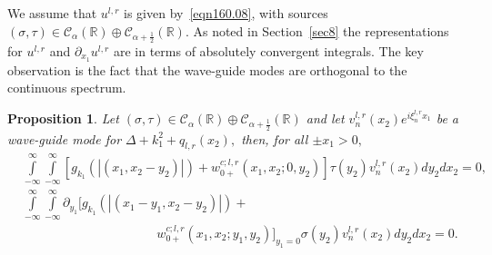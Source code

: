 \documentclass[11pt]{article}
\newcommand\cC{\mathcal{C}}
\newcommand\bbR{\mathbb R}
\newcommand\pa{\partial}
\newtheorem{proposition}{Proposition}
\theoremstyle{definition}
\theoremstyle{remark}
\begin{document}
We assume that $u^{l,r}$ is given by~\eqref{eqn160.08}, with sources
$(\sigma,\tau)\in\cC_{\alpha}(\bbR)\oplus\cC_{\alpha+\frac 12}(\bbR).$ As noted
in Section~\ref{sec8} the representations for $u^{l,r}$ and $\pa_{x_1}u^{l,r}$ are
in terms of absolutely convergent integrals.  The key observation is the
fact that the wave-guide modes are orthogonal to the continuous spectrum.
\begin{proposition}\label{prop2.94}
  Let $(\sigma,\tau)\in \cC_{\alpha}(\bbR)\oplus\cC_{\alpha+\frac 12}(\bbR)$ and
  let $v_{n}^{l,r}(x_2)e^{i\xi_n^{l,r}x_1}$ be a wave-guide mode for
  $\Delta+k_1^2+q_{l,r}(x_2),$ then, for all  $\pm x_1>0,$ 
  \begin{equation}
    \begin{split}
     &\int\limits_{-\infty}^{\infty}\int\limits_{-\infty}^{\infty}[g_{k_1}(|(x_1,x_2-y_2)|)+
        w^{c;l,r}_{0+}(x_1,x_2;0,y_2)]\tau(y_2)v_n^{l,r}(x_2)dy_2dx_2=0,\\
     &\int\limits_{-\infty}^{\infty}\int\limits_{-\infty}^{\infty}\pa_{y_1}[g_{k_1}(|(x_1-y_1,x_2-y_2)|)+\\
        &\phantom{mmmmmmmmmmmm}w^{c;l,r}_{0+}(x_1,x_2;y_1,y_2)]_{y_1=0}\sigma(y_2)v_n^{l,r}(x_2)dy_2dx_2=0.
    \end{split}
  \end{equation}
\end{proposition}
\end{document}
